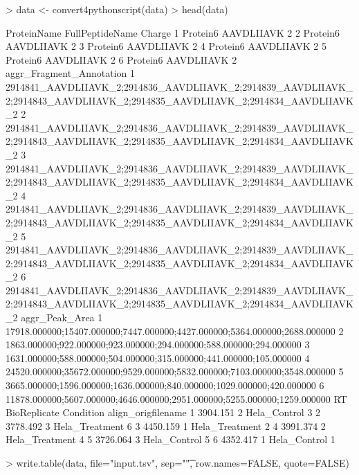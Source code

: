 \documentclass[a4paper]{article}
\begin{document}
\begin{Schunk}
\begin{Sinput}
> data <- convert4pythonscript(data)
> head(data)
\end{Sinput}
\begin{Soutput}
  ProteinName FullPeptideName Charge
1    Protein6      AAVDLIIAVK      2
2    Protein6      AAVDLIIAVK      2
3    Protein6      AAVDLIIAVK      2
4    Protein6      AAVDLIIAVK      2
5    Protein6      AAVDLIIAVK      2
6    Protein6      AAVDLIIAVK      2
                                                                                                       aggr_Fragment_Annotation
1 2914841_AAVDLIIAVK_2;2914836_AAVDLIIAVK_2;2914839_AAVDLIIAVK_2;2914843_AAVDLIIAVK_2;2914835_AAVDLIIAVK_2;2914834_AAVDLIIAVK_2
2 2914841_AAVDLIIAVK_2;2914836_AAVDLIIAVK_2;2914839_AAVDLIIAVK_2;2914843_AAVDLIIAVK_2;2914835_AAVDLIIAVK_2;2914834_AAVDLIIAVK_2
3 2914841_AAVDLIIAVK_2;2914836_AAVDLIIAVK_2;2914839_AAVDLIIAVK_2;2914843_AAVDLIIAVK_2;2914835_AAVDLIIAVK_2;2914834_AAVDLIIAVK_2
4 2914841_AAVDLIIAVK_2;2914836_AAVDLIIAVK_2;2914839_AAVDLIIAVK_2;2914843_AAVDLIIAVK_2;2914835_AAVDLIIAVK_2;2914834_AAVDLIIAVK_2
5 2914841_AAVDLIIAVK_2;2914836_AAVDLIIAVK_2;2914839_AAVDLIIAVK_2;2914843_AAVDLIIAVK_2;2914835_AAVDLIIAVK_2;2914834_AAVDLIIAVK_2
6 2914841_AAVDLIIAVK_2;2914836_AAVDLIIAVK_2;2914839_AAVDLIIAVK_2;2914843_AAVDLIIAVK_2;2914835_AAVDLIIAVK_2;2914834_AAVDLIIAVK_2
                                                             aggr_Peak_Area
1 17918.000000;15407.000000;7447.000000;4427.000000;5364.000000;2688.000000
2        1863.000000;922.000000;923.000000;294.000000;588.000000;294.000000
3        1631.000000;588.000000;504.000000;315.000000;441.000000;105.000000
4 24520.000000;35672.000000;9529.000000;5832.000000;7103.000000;3548.000000
5     3665.000000;1596.000000;1636.000000;840.000000;1029.000000;420.000000
6  11878.000000;5607.000000;4646.000000;2951.000000;5255.000000;1259.000000
        RT BioReplicate      Condition align_origfilename
1 3904.151            2   Hela_Control                  3
2 3778.492            3 Hela_Treatment                  6
3 4450.159            1 Hela_Treatment                  2
4 3991.374            2 Hela_Treatment                  4
5 3726.064            3   Hela_Control                  5
6 4352.417            1   Hela_Control                  1
\end{Soutput}
\end{Schunk}

\begin{Schunk}
\begin{Sinput}
> write.table(data, file="input.tsv", sep="\t", row.names=FALSE, quote=FALSE)
\end{Sinput}
\end{Schunk}
\end{document}
